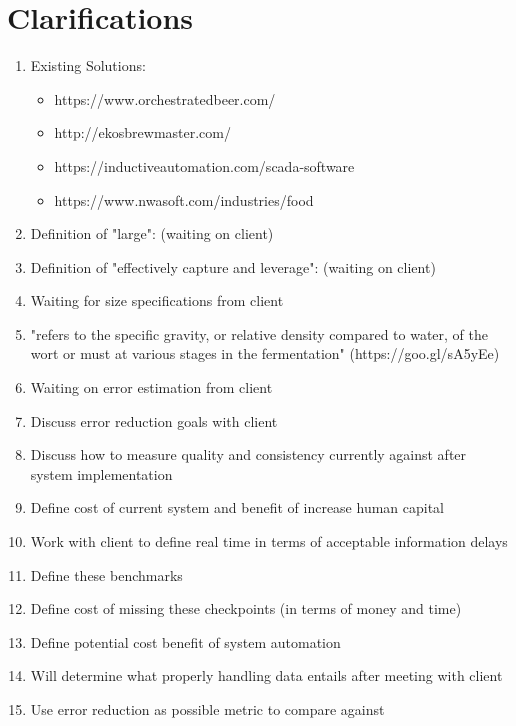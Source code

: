 \documentclass[draftclsnofoot,onecolumn,letterpaper,10pt]{IEEEtran}
\begin{document}
\section{\textbf{Clarifications}}
\begin{enumerate}
\item {Existing Solutions:}
\begin{itemize}
\item {https://www.orchestratedbeer.com/}
\item {http://ekosbrewmaster.com/}
\item {https://inductiveautomation.com/scada-software}
\item {https://www.nwasoft.com/industries/food}
\end{itemize}
\item {Definition of "large": (waiting on client)}
\item {Definition of "effectively capture and leverage": (waiting on client)}
\item {Waiting for size specifications from client}
\item {"refers to the specific gravity, or relative density compared to water, of the wort or must at various stages in the fermentation" (https://goo.gl/sA5yEe)}
\item {Waiting on error estimation from client}
\item {Discuss error reduction goals with client}
\item {Discuss how to measure quality and consistency currently against after system implementation}
\item {Define cost of current system and benefit of increase human capital}
\item {Work with client to define real time in terms of acceptable information delays}
\item {Define these benchmarks}
\item {Define cost of missing these checkpoints (in terms of money and time)}
\item {Define potential cost benefit of system automation}
\item {Will determine what properly handling data entails after meeting with client}
\item {Use error reduction as possible metric to compare against}
\end{enumerate}
\end{document}
